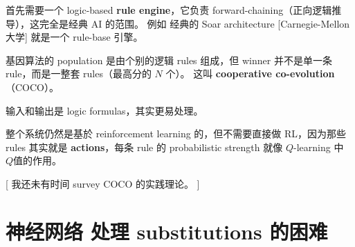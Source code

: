 \documentclass[12pt, orivec]{article}
\begin{document}

首先需要一个 logic-based \textbf{rule engine}，它负责 forward-chaining（正向逻辑推导），这完全是经典 AI 的范围。 例如 经典的 Soar architecture [Carnegie-Mellon 大学] 就是一个 rule-base 引擎。 %


基因算法的 population 是由个别的逻辑 rules 组成，但 winner 并不是单一条 rule，而是一整套 rules（最高分的 $N$ 个）。 这叫 \textbf{cooperative co-evolution}（COCO）。  

输入和输出是 logic formulas，其实更易处理。 

整个系统仍然是基於 reinforcement learning 的，但不需要直接做 RL，因为那些 rules 其实就是 \textbf{actions}，每条 rule  的 probabilistic strength 就像 $Q$-learning 中 $Q$值的作用。 

[ 我还未有时间 survey COCO 的实践理论。 ]

\section{神经网络 处理 substitutions 的困难}
\label{NN}
\end{document}
